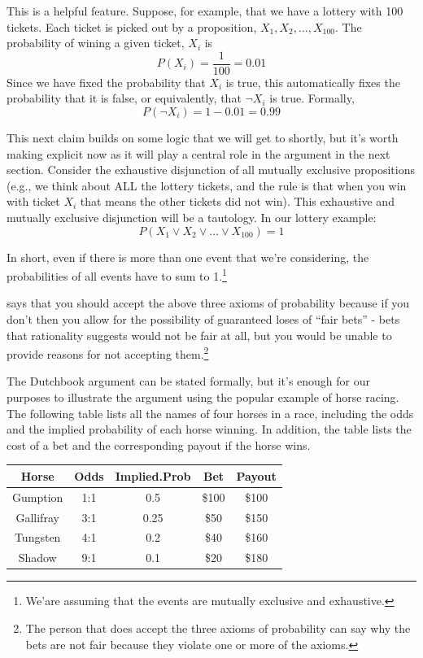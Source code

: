 \documentclass[]{tufte-book}
\begin{document}
This is a helpful feature. Suppose, for example, that we have a lottery with 100 tickets. Each ticket is picked out by a proposition, \(X_1, X_2, \ldots, X_{100}\). The probability of wining a given ticket, \(X_i\) is
\[
P(X_i)=\frac{1}{100}=0.01
\]
Since we have fixed the probability that \(X_i\) is true, this automatically fixes the probability that it is false, or equivalently, that \(\neg X_i\) is true. Formally,
\[
P(\neg X_i) = 1-0.01 = 0.99
\]

This next claim builds on some logic that we will get to shortly, but it's worth making explicit now as it will play a central role in the argument in the next section. Consider the exhaustive disjunction of all mutually exclusive propositions (e.g., we think about ALL the lottery tickets, and the rule is that when you win with ticket \(X_i\) that means the other tickets did not win). This exhaustive and mutually exclusive disjunction will be a tautology. In our lottery example:
\[
P(X_1 \vee X_2 \vee \ldots \vee X_{100}) = 1
\]

In short, even if there is more than one event that we're considering, the probabilities of all events have to sum to 1.\footnote{We'are assuming that the events are mutually exclusive and exhaustive.}

 says that you should accept the above three axioms of probability because if you don't then you allow for the possibility of guaranteed loses of ``fair bets'' - bets that rationality suggests would not be fair at all, but you would be unable to provide reasons for not accepting them.\footnote{The person that does accept the three axioms of probability can say why the bets are not fair because they violate one or more of the axioms.}

The Dutchbook argument can be stated formally, but it's enough for our purposes to illustrate the argument using the popular example of horse racing. The following table lists all the names of four horses in a race, including the odds and the implied probability of each horse winning. In addition, the table lists the cost of a bet and the corresponding payout if the horse wins.

\begin{longtable}[]{@{}ccccc@{}}
\toprule
Horse & Odds & Implied.Prob & Bet & Payout\tabularnewline
\midrule
\endhead
Gumption & 1:1 & 0.5 & \$100 & \$100\tabularnewline
Gallifray & 3:1 & 0.25 & \$50 & \$150\tabularnewline
Tungsten & 4:1 & 0.2 & \$40 & \$160\tabularnewline
Shadow & 9:1 & 0.1 & \$20 & \$180\tabularnewline
\bottomrule
\end{longtable}
\end{document}
